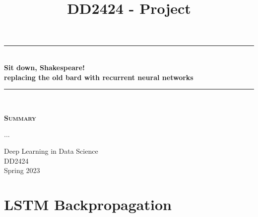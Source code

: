 \documentclass{article}
\title{DD2424 - Project}
\begin{document}

	\begin{titlepage}
		\begin{center} 
			
			\rule{\linewidth}{0.5mm}\\[0.5 cm]
			{ \huge \bfseries Sit down, Shakespeare!}\\[0.3 cm]
			{ \bfseries replacing the old bard with recurrent neural networks}\\[0.3cm]
			\rule{\linewidth}{0.5mm}\\[1 cm]
					
			\small\vfill
			\begin{center}
			\centering
			{\large \bfseries \textsc{Summary}}\\
			\vspace{1cm}
			\begin{minipage}{10cm}
				
				...
			\end{minipage}
			\end{center}
			\large\vfill
						

		\end{center}	
		
		\begin{minipage}{0.4\textwidth}
			\begin{flushleft} \small
				Deep Learning in Data Science\\
				DD2424\\
				Spring 2023
			\end{flushleft}
		\end{minipage}	

	\end{titlepage}

\newpage

\section*{LSTM Backpropagation}
\end{document}
